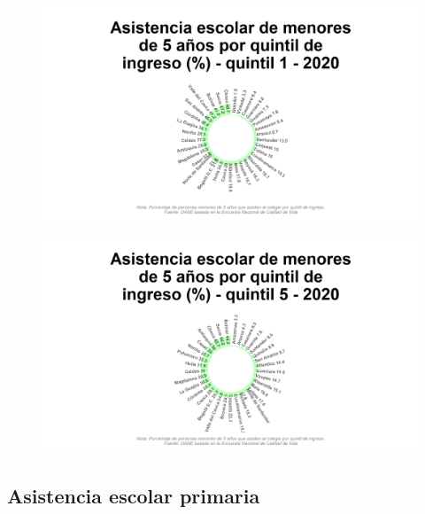     \begin{figure}[H]
        \caption[Asistencia escolar de menores de 5 años para el primer quintil de ingreso por departamentos para 2020 ]{\label{asist5_q1_dpto_static} }
        \begin{center}
        \includegraphics[width=\textwidth,keepaspectratio]{img/var_101_static.png}
        \end{center}
    \end{figure}

    \begin{figure}[H]
        \caption[Asistencia escolar de menores de 5 años para el último quintil de ingreso]{\label{asist5_q5_dpto_static} }
        \begin{center}
        \includegraphics[width=\textwidth,keepaspectratio]{img/var_109_static.png}
        \end{center}
    \end{figure}

    \subsection{Asistencia escolar primaria}

